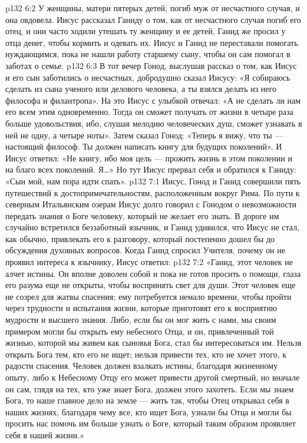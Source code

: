 \vs p132 6:2 \pc У женщины, матери пятерых детей, погиб муж от несчастного случая, и она овдовела. Иисус рассказал Ганиду о том, как от несчастного случая погиб его отец, и они часто ходили утешать ту женщину и ее детей, Ганид же просил у отца денег, чтобы кормить и одевать их. Иисус и Ганид не переставали помогать нуждающимся, пока не нашли работу старшему сыну, чтобы он сам помогал в заботах о семье.
\vs p132 6:3 \pc В тот вечер Гонод, выслушав рассказ о том, как Иисус и его сын заботились о несчастных, добродушно сказал Иисусу: «Я собираюсь сделать из сына ученого или делового человека, а ты взялся делать из него философа и филантропа». На это Иисус с улыбкой отвечал: «А не сделать ли нам его всем этим одновременно. Тогда он сможет получать от жизни в четыре раза больше удовольствия, ибо, слушая мелодию человеческих душ, сможет узнавать в ней не одну, а четыре ноты». Затем сказал Гонод: «Теперь я вижу, что ты --- настоящий философ. Ты должен написать книгу для будущих поколений». И Иисус ответил: «Не книгу, ибо моя цель --- прожить жизнь в этом поколении и на благо всех поколений. Я\ldots » Но тут Иисус прервал себя и обратился к Ганиду: «Сын мой, нам пора идти спать».
\vs p132 7:1 Иисус, Гонод и Ганид совершили пять путешествий к достопримечательностям, расположенным вокруг Рима. По пути к северным Итальянским озерам Иисус долго говорил с Гонодом о невозможности передать знания о Боге человеку, который не желает его знать. В дороге им случайно встретился беззаботный язычник, и Ганид удивился, что Иисус не стал, как обычно, привлекать его к разговору, который постепенно дошел бы до обсуждения духовных вопросов. Когда Ганид спросил Учителя, почему он не проявил интереса к язычнику, Иисус ответил:
\vs p132 7:2 \pc «Ганид, этот человек не алчет истины. Он вполне доволен собой и пока не готов просить о помощи, глаза его разума еще не открыты, чтобы воспринять свет для души. Этот человек еще не созрел для жатвы спасения; ему потребуется немало времени, чтобы пройти через трудности и испытания жизни, которые приготовят его к восприятию мудрости и высшего знания. Либо, если бы он мог жить с нами, мы своим примером могли бы открыть ему небесного Отца, и он, привлеченный той жизнью, которой мы живем как сыновья Бога, стал бы интересоваться им. Нельзя открыть Бога тем, кто его не ищет; нельзя привести тех, кто не хочет этого, к радости спасения. Человек должен взалкать истины, благодаря жизненному опыту, либо к Небесному Отцу его может привести другой смертный, но вначале он сам, глядя на тех, кто уже знает Бога, должен этого захотеть. Если мы знаем Бога, то наше главное дело на земле --- жить так, чтобы Отец открывал себя в наших жизнях, благодаря чему все, кто ищет Бога, узнали бы Отца и могли бы просить нас помочь им больше узнать о Боге, который таким образом проявляет себя в нашей жизни.»
